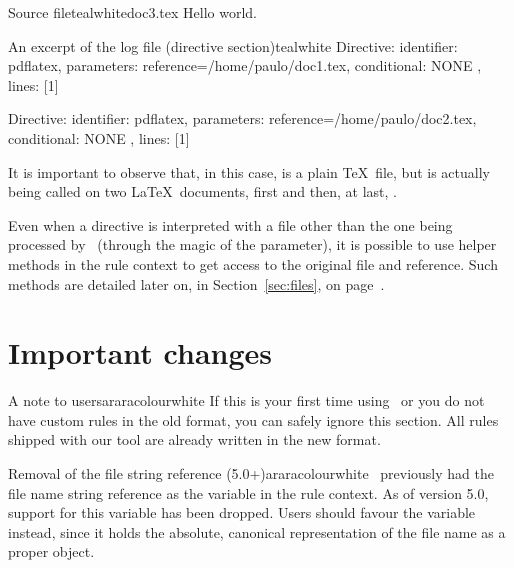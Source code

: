 \begin{ncodebox}{Source file}{teal}{\icnote}{white}{doc3.tex}
Hello world.
\bye
\end{ncodebox}

\begin{codebox}{An excerpt of the log file (directive section)}{teal}{\icnote}{white}
Directive: { identifier: pdflatex, parameters:
{reference=/home/paulo/doc1.tex},
conditional: { NONE }, lines: [1] }

Directive: { identifier: pdflatex, parameters:
{reference=/home/paulo/doc2.tex},
conditional: { NONE }, lines: [1] }
\end{codebox}

It is important to observe that, in this case,  is a plain \TeX\ file, but  is actually being called on two \LaTeX\ documents, first  and then, at last, .

Even when a directive is interpreted with a file other than the one being processed by \arara\ (through the magic of the  parameter), it is possible to use helper methods in the rule context to get access to the original file and reference. Such methods are detailed later on, in Section~\ref{sec:files}, on page~\pageref{sec:files}.

\section{Important changes}
\label{sec:migrationguide}

\begin{messagebox}{A note to users}{araracolour}{\icattention}{white}
If this is your first time using \arara\ or you do not have custom rules in the old format, you can safely ignore this section. All rules shipped with our tool are already written in the new format.
\end{messagebox}

\begin{messagebox}{Removal of the file string reference (5.0+)}{araracolour}{\icattention}{white}
\arara\ previously had the file name string reference as the  variable in the rule context. As of version 5.0, support for this variable has been dropped. Users should favour the  variable instead, since it holds the absolute, canonical representation of the file name as a proper  object.
\end{messagebox}

